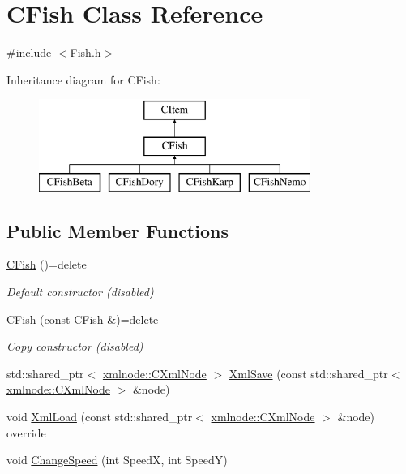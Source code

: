 \hypertarget{class_c_fish}{}\section{C\+Fish Class Reference}
\label{class_c_fish}


{\ttfamily \#include $<$Fish.\+h$>$}

Inheritance diagram for C\+Fish\+:\begin{figure}[H]
\begin{center}
\leavevmode
\includegraphics[height=3.000000cm]{class_c_fish}
\end{center}
\end{figure}
\subsection*{Public Member Functions}
\begin{DoxyCompactItemize}
\item 
\mbox{\label{class_c_fish_ac4c190f887382bb976a3bca156010d60}} 
\mbox{\hyperlink{class_c_fish_ac4c190f887382bb976a3bca156010d60}{C\+Fish}} ()=delete
\begin{DoxyCompactList}\small\item\em Default constructor (disabled) \end{DoxyCompactList}\item 
\mbox{\label{class_c_fish_a74ba012f126e8e105638cba899c5434b}} 
\mbox{\hyperlink{class_c_fish_a74ba012f126e8e105638cba899c5434b}{C\+Fish}} (const \mbox{\hyperlink{class_c_fish}{C\+Fish}} \&)=delete
\begin{DoxyCompactList}\small\item\em Copy constructor (disabled) \end{DoxyCompactList}\item 
std\+::shared\+\_\+ptr$<$ \mbox{\hyperlink{classxmlnode_1_1_c_xml_node}{xmlnode\+::\+C\+Xml\+Node}} $>$ \mbox{\hyperlink{class_c_fish_abfc997d2d755be8f94069c57e75a854b}{Xml\+Save}} (const std\+::shared\+\_\+ptr$<$ \mbox{\hyperlink{classxmlnode_1_1_c_xml_node}{xmlnode\+::\+C\+Xml\+Node}} $>$ \&node)
\item 
void \mbox{\hyperlink{class_c_fish_a997f243d89dd8c397597010eec4b611e}{Xml\+Load}} (const std\+::shared\+\_\+ptr$<$ \mbox{\hyperlink{classxmlnode_1_1_c_xml_node}{xmlnode\+::\+C\+Xml\+Node}} $>$ \&node) override
\item 
void \mbox{\hyperlink{class_c_fish_ab3d626359c6bcbb020583ddd19032447}{Change\+Speed}} (int SpeedX, int SpeedY)
\end{DoxyCompactItemize}
